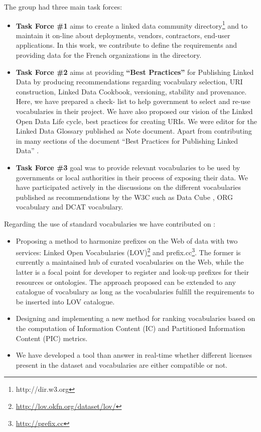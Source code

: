 The group had three main task forces:
\begin{itemize}
\item \textbf{Task Force \#1} aims to create a linked data community directory\footnote{http://dir.w3.org} and to maintain it on-line about deployments, vendors, contractors, end-user applications. In this work, we contribute to define the requirements and providing data for the French organizations in the directory.

\item \textbf{Task Force \#2} aims at providing \textbf{``Best Practices''} for Publishing Linked Data by producing recommendations regarding vocabulary selection, URI construction, Linked Data Cookbook, versioning, stability and provenance. Here, we have prepared a check- list to help government to select and re-use vocabularies in their project. We have also proposed our vision of the Linked Open Data Life cycle, best practices for creating URIs. We were editor for the Linked Data Glossary \cite{glossairegld} published as Note document. Apart from contributing in many sections of the document ``Best Practices for Publishing Linked Data'' \cite{bpgld}.

\item \textbf{Task Force \#3} goal was to provide relevant vocabularies to be used by governments or local authorities in their process of exposing their data. We have participated actively in the discussions on the different vocabularies published as recommendations by the W3C such as Data Cube \cite{dcube}, ORG vocabulary \cite{org} and DCAT \cite{dcat} vocabulary.
\end{itemize}

Regarding the use of standard vocabularies we have contributed on : 
\begin{itemize}

\item  Proposing a method to harmonize prefixes on the Web of data  with two services: Linked Open Vocabularies (LOV)\footnote{\url{http://lov.okfn.org/dataset/lov/}} and prefix.cc\footnote{\url{http://prefix.cc}}. The former is currently a maintained hub of curated vocabularies on the Web, while the latter is a focal point for developer to register and look-up prefixes for their resources or ontologies. The approach proposed can be extended to any catalogue of vocabulary as long as the vocabularies fulfill the requirements to be inserted into LOV catalogue. 

\item  Designing and implementing a new method for ranking vocabularies based on the computation of Information Content (IC) and Partitioned Information Content (PIC) metrics.

\item We have developed a tool than answer in real-time whether different licenses present in the dataset and vocabularies are either compatible or not. 
\end{itemize}

